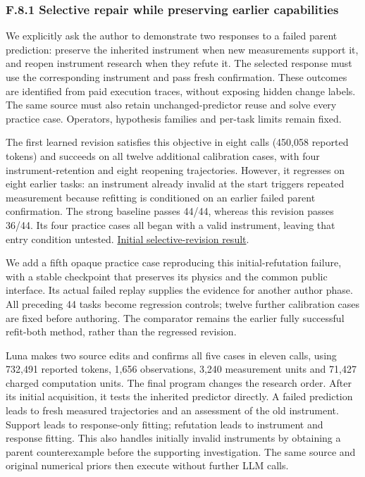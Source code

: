 \documentclass[twoside,11pt]{article}
\begin{document}
\subsubsection*{F.8.1 Selective repair while preserving earlier capabilities}

We explicitly ask the author to demonstrate two responses to a failed parent
prediction: preserve the inherited instrument when new measurements support it,
and reopen instrument research when they refute it. The selected response must
use the corresponding instrument and pass fresh confirmation. These outcomes are
identified from paid execution traces, without exposing hidden change labels.
The same source must also retain unchanged-predictor reuse and solve every
practice case. Operators, hypothesis families and per-task limits remain fixed.


The first learned revision satisfies this objective in eight calls (450,058
reported tokens) and succeeds
on all twelve additional calibration cases, with four instrument-retention and
eight reopening trajectories. However, it regresses on eight earlier tasks:
an instrument already invalid at the start triggers repeated measurement because
refitting is conditioned on an earlier failed parent confirmation. The strong
baseline passes 44/44, whereas this revision passes 36/44. Its four practice cases
all began with a valid instrument, leaving that entry condition untested.
\hyperlink{artifact-73}{Initial selective-revision result}.


We add a fifth opaque practice case reproducing this initial-refutation failure,
with a stable checkpoint that preserves its physics and the common public
interface. Its actual failed replay supplies the evidence for another author
phase. All preceding 44 tasks become regression controls; twelve further
calibration cases are fixed before authoring. The comparator remains the earlier
fully successful refit-both method, rather than the regressed revision.


Luna makes two source edits and confirms all five cases in eleven calls, using
732,491 reported tokens, 1,656 observations, 3,240 measurement units and 71,427
charged computation units. The final program changes the research order. After
its initial acquisition, it tests the inherited predictor directly. A failed
prediction leads to fresh measured trajectories and an assessment of the old
instrument. Support leads to response-only fitting; refutation leads to instrument
and response fitting. This also handles initially invalid instruments by obtaining
a parent counterexample before the supporting investigation. The same source
and original numerical priors then execute without further LLM calls.
\end{document}
